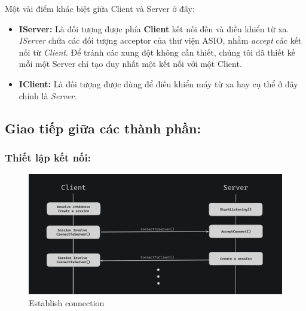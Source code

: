 Một vài điểm khác biệt giữa Client và Server ở đây: 
\begin{itemize}
	\item \textbf{IServer: } Là đối tượng được phía \textbf{Client} kết nối đến và điều khiển từ xa. \textit{IServer} chứa các đối tượng acceptor của thư viện ASIO, nhằm \textit{accept} các kết nối từ \textit{Client}. Để tránh các xung đột không cần thiết, chúng tôi đã thiết kế mỗi một Server chỉ tạo duy nhất một kết nối với một Client.
	\item \textbf{IClient: } Là đối tượng được dùng để điều khiển máy từ xa hay cụ thể ở đây chính là \textit{Server}. 
\end{itemize}

\subsection{Giao tiếp giữa các thành phần: }

\subsubsection{Thiết lập kết nối: }
\begin{figure}[H]
	\centering
	\includegraphics[width=\linewidth]{latex/architechture/connecting}
	\caption{Establish connection}
\end{figure}

